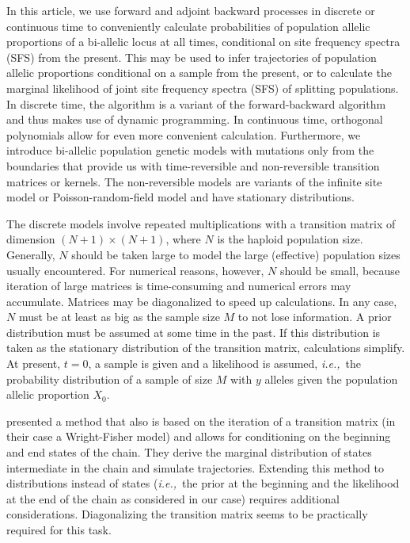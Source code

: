 \documentclass[preprint]{elsarticle}
\newcommand\ie{{\it i.e.,}}
\newcommand\x[1]{\ensuremath{X_{#1}}}
\begin{document}
In this article, we use forward and adjoint backward processes in discrete or continuous time to conveniently calculate probabilities of population allelic proportions of a bi-allelic locus at all times, conditional on site frequency spectra (SFS) from the present. This may be used to infer trajectories of population allelic proportions conditional on a sample from the present, or to calculate the marginal likelihood of joint site frequency spectra (SFS) of splitting populations. In discrete time, the algorithm is a variant of the forward-backward algorithm and thus makes use of dynamic programming. In continuous time, orthogonal polynomials allow for even more convenient calculation. Furthermore, we introduce bi-allelic population genetic models with mutations only from the boundaries that provide us with time-reversible and non-reversible transition matrices or kernels. The non-reversible models are variants of the infinite site model \citep{Kimu69} or Poisson-random-field model \citep{Sawy92} and have stationary distributions.

The discrete models involve repeated multiplications with a transition matrix of dimension $(N+1)\times(N+1)$, where $N$ is the haploid population size. Generally, $N$ should be taken large to model the large (effective) population sizes usually encountered. For numerical reasons, however, $N$ should be small, because iteration of large matrices is time-consuming and numerical errors may accumulate. Matrices may be diagonalized to speed up calculations. In any case, $N$ must be at least as big as the sample size $M$ to not lose information. A prior distribution must be assumed at some time in the past. If this distribution is taken as the stationary distribution of the transition matrix, calculations simplify. At present, $t=0$, a sample is given and a likelihood is assumed, \ie\ the probability distribution of a sample of size $M$ with $y$ alleles given the population allelic proportion $\x{0}$.

\citet{Zhao14} presented a method that also is based on the iteration of a transition matrix (in their case a Wright-Fisher model) and allows for conditioning on the beginning and end states of the chain. They derive the marginal distribution of states intermediate in the chain and simulate trajectories. Extending this method to distributions instead of states (\ie\ the prior at the beginning and the likelihood at the end of the chain as considered in our case) requires additional considerations. Diagonalizing the transition matrix seems to be practically required for this task. 
\end{document}
